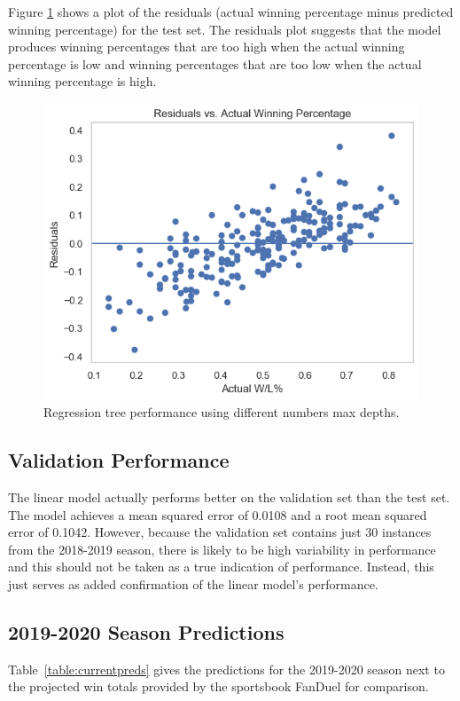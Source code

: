 \documentclass[pageno]{jpaper}
\begin{document}
Figure \ref{fig:residuals} shows a plot of the residuals (actual winning percentage minus predicted winning percentage) for the test set. The residuals plot suggests that the model produces winning percentages that are too high when the actual winning percentage is low and winning percentages that are too low when the actual winning percentage is high.

\begin{figure}[hbt]
\centering
\includegraphics[width=0.75\linewidth]{residuals.png}
\caption{Regression tree performance using different numbers max depths.}
\label{fig:residuals}
\end{figure}

\newpage

\subsection{Validation Performance}

The linear model actually performs better on the validation set than the test set. The model achieves a mean squared error of 0.0108 and a root mean squared error of 0.1042. However, because the validation set contains just 30 instances from the 2018-2019 season, there is likely to be high variability in performance and this should not be taken as a true indication of performance. Instead, this just serves as added confirmation of the linear model's performance.

\subsection{2019-2020 Season Predictions}
\label{section:currentseason}

Table~\ref{table:currentpreds} gives the predictions for the 2019-2020 season next to the projected win totals provided by the sportsbook FanDuel \cite{fanduel} for comparison.
\end{document}
